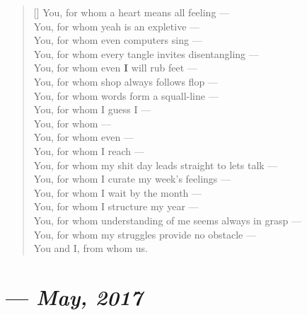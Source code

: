 \begin{verse}[\textwidth]
  You, for whom a heart means all feeling ---\\
  You, for whom yeah is an expletive ---\\
  You, for whom even computers sing ---\\
  You, for whom every tangle invites disentangling ---\\
  You, for whom even \textbf{I} will rub feet ---\\
  You, for whom shop always follows flop ---\\
  You, for whom words form a squall-line ---\\
  You, for whom I guess I ---\\
  You, for whom ---\\
  You, for whom even ---\\
  You, for whom I reach ---\\
  You, for whom my shit day leads straight to lets talk ---\\
  You, for whom I curate my week's feelings ---\\
  You, for whom I wait by the month ---\\
  You, for whom I structure my year ---\\
  You, for whom understanding of me seems always in grasp ---\\
  You, for whom my struggles provide no obstacle ---\\
  You and I, from whom us.
\end{verse}
\newpage

\section{--- \textit{May, 2017}}

